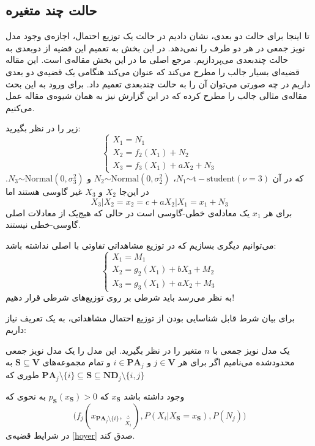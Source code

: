 \documentclass{article}
\begin{document}
\subsection{حالت چند متغیره}
تا اینجا برای حالت دو بعدی، نشان دادیم در حالت 
یک توزیع احتمال، اجازه‌ی وجود مدل نویز جمعی در هر دو طرف را نمی‌دهد. در این بخش به تعمیم این قضیه از دوبعدی به حالت چندبعدی می‌پردازیم. مرجع اصلی ما در این بخش مقاله‌ی 
\cite{continous}
است. این مقاله‌ قضیه‌ای بسیار جالب را مطرح می‌کند که عنوان می‌کند هنگامی یک قضیه‌ی 
دو بعدی داریم در چه صورتی می‌توان آن را به حالت چند‌بعدی تعمیم داد. برای ورود به این بحث مقاله‌ی 
\cite{continous}
مثالی جالب را مطرح کرده که در این گزارش نیز به همان شیوه‌ی مقاله عمل می‌کنیم.
\begin{exa}
	زیر را در نظر بگیرید:
\begin{equation}
\begin{cases}
X_1 = N_1\\
X_2 = f_2(X_1) + N_2\\
X_3 = f_3(X_1)+aX_2 + N_3
\end{cases}
\end{equation}
که در آن
 $N_1 \stackrel{}{\sim} \mathrm{t-student}(\nu =3)$،
 $N_2 \stackrel{}{\sim} \mathrm{Normal}(0, \sigma_2^2)$ و 
 $N_3 \stackrel{}{\sim}\mathrm{Normal}(0, \sigma_3^2)$.
 در این‌جا $X_2$ و $X_3$ غیر گاوسی هستند  اما
 $$X_3|X_2=x_2 = c + aX_2|X_1=x_1 + N_3$$
 برای هر $x_1$ یک معادله‌ی خطی-گاوسی است در حالی که هیج‌یک از معادلات اصلی 
 گاوسی-خطی نیستند. 

می‌توانیم 
دیگری بسازیم که در توزیع مشاهداتی تفاوتی با 
اصلی نداشته باشد:
\begin{equation}
\begin{cases}
X_1 = M_1\\
X_2 = g_2(X_1) + bX_3 + M_2\\
X_3 = g_3(X_1)+aX_2 + M_3
\end{cases}
\end{equation}
به نظر می‌رسد باید شرطی بر روی توزیع‌های شرطی قرار دهیم!
\end{exa}
برای بیان شرط قابل شناسایی بودن از توزیع احتمال مشاهداتی، به یک تعریف نیاز داریم:
\begin{den}
یک مدل نویز جمعی با $n$ متغیر را در نظر بگیرید. این مدل را یک مدل نویز جمعی محدودشده می‌نامیم اگر برای هر 
$j \in \mathbf{V}$
و
$i \in \mathbf{PA}_j$
و تمام مجموعه‌های
$\mathbf{S} \subseteq \mathbf{V}$
به طوری که 
$\mathbf{PA}_j  \setminus \{i\} \subseteq \mathbf{S} \subseteq \mathbf{ND}_j \setminus \{i, j\}$

وجود داشته ‌باشد 
$x_{\mathbf{S}}$
که
$p_{\mathbf{S}}(x_{\mathbf{S}})>0$
به نحوی که 
$$\Big(f_j(x_{\textbf{PA}_{j}\setminus \{i\}}, \underbrace{\cdot}_{X_i}),
 P(X_i | X_{\textbf{S}}=x_{\textbf{S}}), P(N_j)\Big)$$
 در شرایط قضیه‌ی 
 \eqref{hoyer}
 صدق کند.
\end{den}
\end{document}
